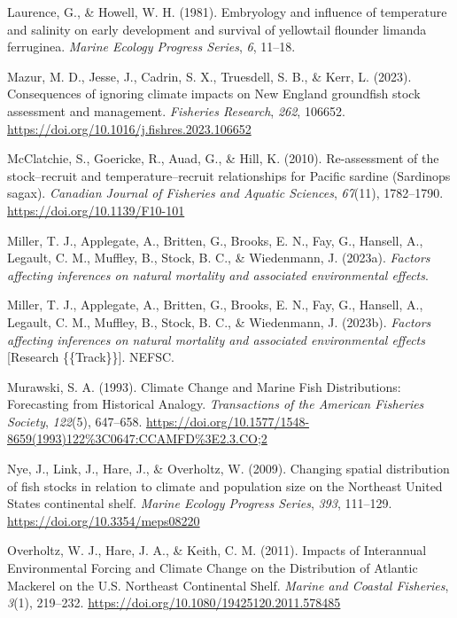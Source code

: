 \documentclass[
  12pt,
]{article}
\newlength{\cslhangindent}
\newenvironment{CSLReferences}[2] %
 {\begin{list}{}{%
  \setlength{\itemindent}{0pt}
  \setlength{\leftmargin}{0pt}
  \setlength{\parsep}{0pt}
  \ifodd #1
   \setlength{\leftmargin}{\cslhangindent}
   \setlength{\itemindent}{-1\cslhangindent}
  \fi
  \setlength{\itemsep}{#2\baselineskip}}}
 {\end{list}}
\begin{document}
\begin{CSLReferences}{1}{2}
Laurence, G., \& Howell, W. H. (1981). Embryology and influence of temperature and salinity on early development and survival of yellowtail flounder limanda ferruginea. \emph{Marine Ecology Progress Series}, \emph{6}, 11--18.

Mazur, M. D., Jesse, J., Cadrin, S. X., Truesdell, S. B., \& Kerr, L. (2023). Consequences of ignoring climate impacts on New England groundfish stock assessment and management. \emph{Fisheries Research}, \emph{262}, 106652. \url{https://doi.org/10.1016/j.fishres.2023.106652}

McClatchie, S., Goericke, R., Auad, G., \& Hill, K. (2010). Re-assessment of the stock--recruit and temperature--recruit relationships for {Pacific} sardine ({Sardinops} sagax). \emph{Canadian Journal of Fisheries and Aquatic Sciences}, \emph{67}(11), 1782--1790. \url{https://doi.org/10.1139/F10-101}

Miller, T. J., Applegate, A., Britten, G., Brooks, E. N., Fay, G., Hansell, A., Legault, C. M., Muffley, B., Stock, B. C., \& Wiedenmann, J. (2023a). \emph{Factors affecting inferences on natural mortality and associated environmental effects}.

Miller, T. J., Applegate, A., Britten, G., Brooks, E. N., Fay, G., Hansell, A., Legault, C. M., Muffley, B., Stock, B. C., \& Wiedenmann, J. (2023b). \emph{Factors affecting inferences on natural mortality and associated environmental effects} {[}Research \{\{Track\}\}{]}. NEFSC.

Murawski, S. A. (1993). Climate Change and Marine Fish Distributions: Forecasting from Historical Analogy. \emph{Transactions of the American Fisheries Society}, \emph{122}(5), 647--658. \url{https://doi.org/10.1577/1548-8659(1993)122\%3C0647:CCAMFD\%3E2.3.CO;2}

Nye, J., Link, J., Hare, J., \& Overholtz, W. (2009). Changing spatial distribution of fish stocks in relation to climate and population size on the Northeast United States continental shelf. \emph{Marine Ecology Progress Series}, \emph{393}, 111--129. \url{https://doi.org/10.3354/meps08220}

Overholtz, W. J., Hare, J. A., \& Keith, C. M. (2011). Impacts of Interannual Environmental Forcing and Climate Change on the Distribution of Atlantic Mackerel on the U.S. Northeast Continental Shelf. \emph{Marine and Coastal Fisheries}, \emph{3}(1), 219--232. \url{https://doi.org/10.1080/19425120.2011.578485}


\end{CSLReferences}
\end{document}
